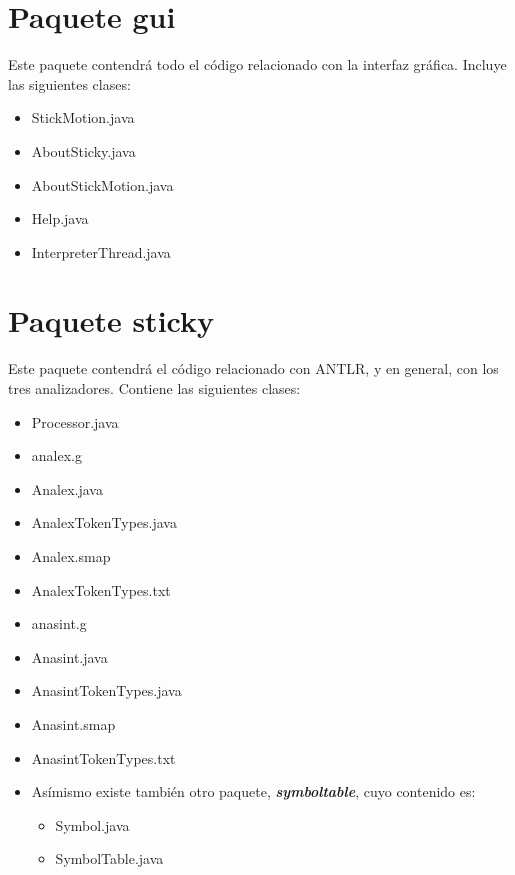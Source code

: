    \section{Paquete gui}
   Este paquete contendrá todo el código relacionado con la interfaz gráfica. Incluye las siguientes clases:
   \begin{itemize}
      \item StickMotion.java
      \item AboutSticky.java
      \item AboutStickMotion.java
      \item Help.java
      \item InterpreterThread.java
   \end{itemize}


   \section{Paquete sticky}
   Este paquete contendrá el código relacionado con ANTLR, y en general, con los tres analizadores. Contiene las siguientes clases:
   \begin{itemize}
      \item Processor.java
      \item analex.g
      \item Analex.java
      \item AnalexTokenTypes.java 
      \item Analex.smap 
      \item AnalexTokenTypes.txt
      \item anasint.g 
      \item Anasint.java 
      \item AnasintTokenTypes.java 
      \item Anasint.smap
      \item AnasintTokenTypes.txt
      \item Asímismo existe también otro paquete, \textbf{\textit{symboltable}}, cuyo contenido es:
            \begin{itemize}
               \item Symbol.java
               \item SymbolTable.java
            \end{itemize}
   \end{itemize}



